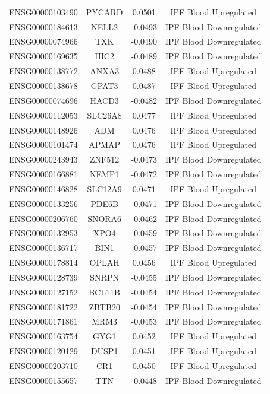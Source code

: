 \documentclass[
]{article}
\begin{document}
\begin{singlespace}
\begin{longtable}[t]{lccc}
ENSG00000103490 & PYCARD & 0.0501 & IPF Blood Upregulated\\
ENSG00000184613 & NELL2 & -0.0493 & IPF Blood Downregulated\\
ENSG00000074966 & TXK & -0.0490 & IPF Blood Downregulated\\
ENSG00000169635 & HIC2 & -0.0489 & IPF Blood Downregulated\\
\addlinespace
ENSG00000138772 & ANXA3 & 0.0488 & IPF Blood Upregulated\\
ENSG00000138678 & GPAT3 & 0.0487 & IPF Blood Upregulated\\
ENSG00000074696 & HACD3 & -0.0482 & IPF Blood Downregulated\\
ENSG00000112053 & SLC26A8 & 0.0477 & IPF Blood Upregulated\\
ENSG00000148926 & ADM & 0.0476 & IPF Blood Upregulated\\
\addlinespace
ENSG00000101474 & APMAP & 0.0476 & IPF Blood Upregulated\\
ENSG00000243943 & ZNF512 & -0.0473 & IPF Blood Downregulated\\
ENSG00000166881 & NEMP1 & -0.0472 & IPF Blood Downregulated\\
ENSG00000146828 & SLC12A9 & 0.0471 & IPF Blood Upregulated\\
ENSG00000133256 & PDE6B & -0.0471 & IPF Blood Downregulated\\
\addlinespace
ENSG00000206760 & SNORA6 & -0.0462 & IPF Blood Downregulated\\
ENSG00000132953 & XPO4 & -0.0459 & IPF Blood Downregulated\\
ENSG00000136717 & BIN1 & -0.0457 & IPF Blood Downregulated\\
ENSG00000178814 & OPLAH & 0.0456 & IPF Blood Upregulated\\
ENSG00000128739 & SNRPN & -0.0455 & IPF Blood Downregulated\\
\addlinespace
ENSG00000127152 & BCL11B & -0.0454 & IPF Blood Downregulated\\
ENSG00000181722 & ZBTB20 & -0.0454 & IPF Blood Downregulated\\
ENSG00000171861 & MRM3 & -0.0453 & IPF Blood Downregulated\\
ENSG00000163754 & GYG1 & 0.0452 & IPF Blood Upregulated\\
ENSG00000120129 & DUSP1 & 0.0451 & IPF Blood Upregulated\\
\addlinespace
ENSG00000203710 & CR1 & 0.0450 & IPF Blood Upregulated\\
ENSG00000155657 & TTN & -0.0448 & IPF Blood Downregulated\\

\end{longtable}
\end{singlespace}
\end{document}
